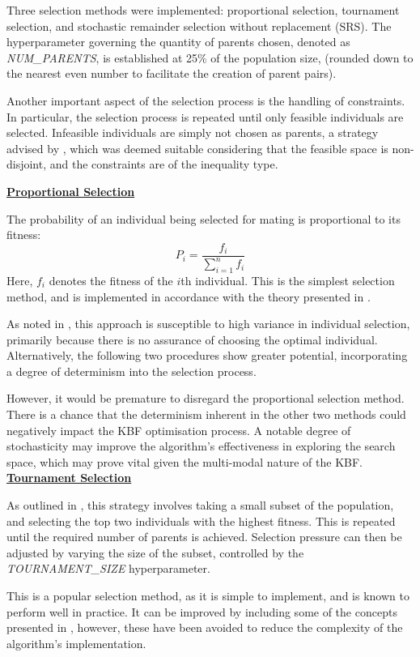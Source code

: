\documentclass[10pt]{article}
\begin{document}
\begin{multicols}{2}
Three selection methods were implemented: proportional selection, tournament selection, and stochastic remainder selection without replacement (SRS). The hyperparameter governing the quantity of parents chosen, denoted as \textit{NUM\_PARENTS}, is established at 25\% of the population size, (rounded down to the nearest even number to facilitate the creation of parent pairs).

Another important aspect of the selection process is the handling of constraints. In particular, the selection process is repeated until only feasible individuals are selected. Infeasible individuals are simply not chosen as parents, a strategy advised by \cite{parks2023geneticalgorithms}, which was deemed suitable considering that the feasible space is non-disjoint, and the constraints are of the inequality type.

\textbf{\underline{Proportional Selection}}

The probability of an individual being selected for mating is proportional to its fitness:
\[
    P_i = \frac{f_i}{\sum_{i=1}^{n} f_i}
\]
Here, \(f_i\) denotes the fitness of the \(i\)th individual. This is the simplest selection method, and is implemented in accordance with the theory presented in \cite{parks2023geneticalgorithms}.

As noted in \cite{parks2023geneticalgorithms}, this approach is susceptible to high variance in individual selection, primarily because there is no assurance of choosing the optimal individual. Alternatively, the following two procedures show greater potential, incorporating a degree of determinism into the selection process.

However, it would be premature to disregard the proportional selection method. There is a chance that the determinism inherent in the other two methods could negatively impact the KBF optimisation process. A notable degree of stochasticity may improve the algorithm's effectiveness in exploring the search space, which may prove vital given the multi-modal nature of the KBF.
\textbf{\underline{Tournament Selection}}

As outlined in \cite{parks2023geneticalgorithms}, this strategy involves taking a small subset of the population, and selecting the top two individuals with the highest fitness. This is repeated until the required number of parents is achieved. Selection pressure can then be adjusted by varying the size of the subset, controlled by the \textit{TOURNAMENT\_SIZE} hyperparameter.

This is a popular selection method, as it is simple to implement, and is known to perform well in practice. It can be improved by including some of the concepts presented in \cite{Miller1995GeneticAT}, however, these have been avoided to reduce the complexity of the algorithm's implementation.


\end{multicols}
\end{document}
